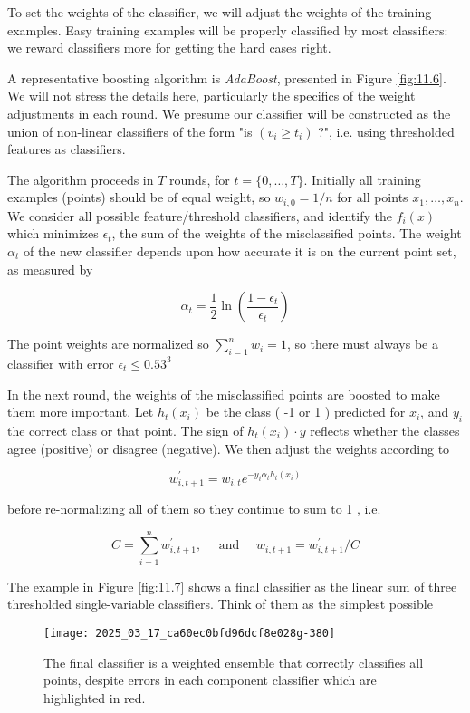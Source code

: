 \documentclass[10pt]{article}
\begin{document}
\begin{enumerate}
To set the weights of the classifier, we will adjust the weights of the training examples. Easy training examples will be properly classified by most classifiers: we reward classifiers more for getting the hard cases right.

A representative boosting algorithm is \textit{AdaBoost}, presented in Figure \ref{fig:11.6}. We will not stress the details here, particularly the specifics of the weight adjustments in each round. We presume our classifier will be constructed as the union of non-linear classifiers of the form "is $\left(v_{i} \geq t_{i}\right)$ ?", i.e. using thresholded features as classifiers.

The algorithm proceeds in $T$ rounds, for $t=\{0, \ldots, T\}$. Initially all training examples (points) should be of equal weight, so $w_{i, 0}=1 / n$ for all points $x_{1}, \ldots, x_{n}$. We consider all possible feature/threshold classifiers, and identify the $f_{i}(x)$ which minimizes $\epsilon_{t}$, the sum of the weights of the misclassified points. The weight $\alpha_{t}$ of the new classifier depends upon how accurate it is on the current point set, as measured by

\[
\alpha_{t}=\frac{1}{2} \ln \left(\frac{1-\epsilon_{t}}{\epsilon_{t}}\right)
\]

The point weights are normalized so $\sum_{i=1}^{n} w_{i}=1$, so there must always be a classifier with error $\epsilon_{t} \leq 0.53^{3}$

In the next round, the weights of the misclassified points are boosted to make them more important. Let $h_{t}\left(x_{i}\right)$ be the class ( -1 or 1 ) predicted for $x_{i}$, and $y_{i}$ the correct class or that point. The sign of $h_{t}\left(x_{i}\right) \cdot y$ reflects whether the classes agree (positive) or disagree (negative). We then adjust the weights according to

\[
w_{i, t+1}^{\prime}=w_{i, t} e^{-y_{i} \alpha_{t} h_{t}\left(x_{i}\right)}
\]

before re-normalizing all of them so they continue to sum to 1 , i.e.

\[
C=\sum_{i=1}^{n} w_{i, t+1}^{\prime}, \quad \text { and } \quad w_{i, t+1}=w_{i, t+1}^{\prime} / C
\]

The example in Figure \ref{fig:11.7} shows a final classifier as the linear sum of three thresholded single-variable classifiers. Think of them as the simplest possible

\begin{figure}[h!]
\centering
\texttt{[image: 2025\_03\_17\_ca60ec0bfd96dcf8e028g-380]}
\caption{The final classifier is a weighted ensemble that correctly classifies all points, despite errors in each component classifier which are highlighted in red.}
\end{figure}


\end{enumerate}
\end{document}
